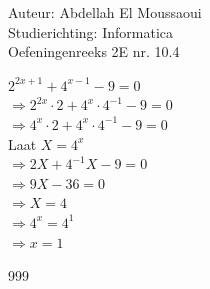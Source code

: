 \documentclass[a4paper]{article}
\begin{document}
  
\noindent \large Auteur: Abdellah El Moussaoui \\
\noindent \large Studierichting: Informatica\\
\noindent \large Oefeningenreeks 2E nr. 10.4\\

\medskip

\normalsize


$2^{2x+1} + 4^{x-1}-9=0$\\

$\Rightarrow 2^{2x}\cdot2 + 4^x \cdot 4^{-1}-9=0$\\

$\Rightarrow 4^x\cdot2 + 4^x \cdot 4^{-1}-9=0$\\

Laat $X = 4^x$\\

$\Rightarrow 2X + 4^{-1}X-9=0$\\

$\Rightarrow 9X-36=0$\\

$\Rightarrow X=4$\\

$\Rightarrow 4^x=4^1$\\

$\Rightarrow x=1$\\




\begin{thebibliography}{999}
\end{thebibliography}
\end{document}
